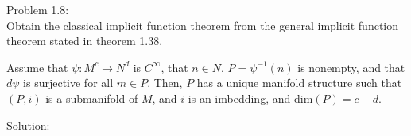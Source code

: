 \documentclass[paper=a4, fontsize=11pt]{article} %
\numberwithin{equation}{section} %
\numberwithin{figure}{section} %
\numberwithin{table}{section} %
\begin{document}
Problem 1.8:\\
Obtain the classical implicit function theorem from the general implicit function theorem stated in theorem 1.38.\\

\begin{theorem}[1.38]
Assume that $\psi:M^c \to N^d$ is $C^{\infty}$, that $n \in N$, $P=\psi^{-1}(n)$ is nonempty, and that $d\psi$ is surjective for all $m \in P$. 
Then, $P$ has a unique manifold structure such that $(P,i)$ is a submanifold of $M$, and $i$ is an imbedding, and $\mathrm{dim}(P)=c-d$.
\end{theorem}

Solution:\\


\end{document}

